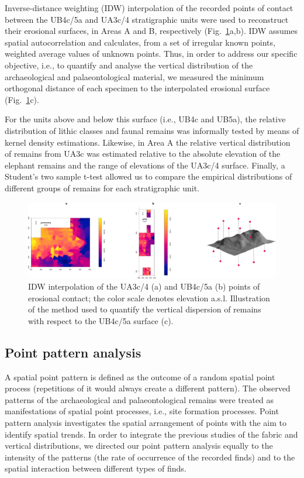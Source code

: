 \documentclass[review,authoryear,times]{elsarticle} %
\begin{document}
Inverse-distance weighting (IDW) interpolation of the recorded points of contact between the UB4c/5a and UA3c/4 stratigraphic units were used to reconstruct their erosional surfaces, in Areas A and B, respectively (Fig.~\ref{fig:3}a,b). IDW assumes spatial autocorrelation and calculates, from a set of irregular known points, weighted average values of unknown points. Thus, in order to address our specific objective, i.e., to quantify and analyse the vertical distribution of the archaeological and palaeontological material, we measured the minimum orthogonal distance of each specimen to the interpolated erosional surface (Fig.~\ref{fig:3}c).

For the units above and below this surface (i.e., UB4c and UB5a), the relative distribution of lithic classes and faunal remains was informally tested by means of kernel density estimations. Likewise, in Area A the relative vertical distribution of remains from UA3c was estimated relative to the absolute elevation of the elephant remains and the range of elevations of the UA3c/4 surface. Finally, a Student's two sample t-test allowed us to compare the empirical distributions of different groups of remains for each stratigraphic unit.

\begin{figure}[]
  \centering
  \includegraphics[width=1\textwidth]{../artwork/Fig3.pdf}
  \caption{IDW interpolation of the UA3c/4 (a) and UB4c/5a (b) points of erosional contact; the color scale denotes elevation a.s.l. Illustration of the method used to quantify the vertical dispersion of remains with respect to the UB4c/5a surface (c).}
  \label{fig:3}
\end{figure}

\subsection{Point pattern analysis}

A spatial point pattern is defined as the outcome of a random spatial point process (repetitions of it would always create a different pattern). The observed patterns of the archaeological and palaeontological remains were treated as manifestations of spatial point processes, i.e., site formation processes. Point pattern analysis investigates the spatial arrangement of points with the aim to identify spatial trends. In order to integrate the previous studies of the fabric and vertical distributions, we directed our point pattern analysis equally to the intensity of the patterns (the rate of occurrence of the recorded finds) and to the spatial interaction between different types of finds.
\end{document}
